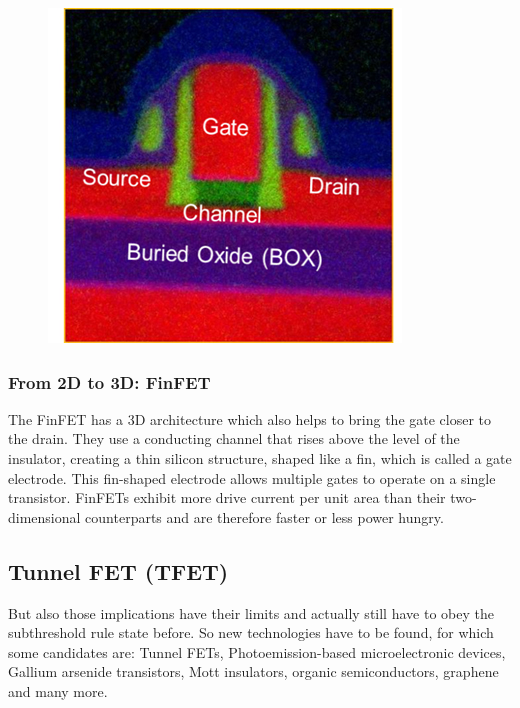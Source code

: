 \documentclass[11pt]{article}
\begin{document}
\begin{figure}[H]
\centering
\includegraphics[width=.3\textwidth]{UTBSOIem}
\label{fig:UTBSOIem}
\end{figure}

\subsubsection{From 2D to 3D: FinFET}
The FinFET has a 3D architecture which also helps to bring the gate closer to the drain. They use a conducting channel that rises above the level of the insulator, creating a thin silicon structure, shaped like a fin, which is called a gate electrode. This fin-shaped electrode allows multiple gates to operate on a single transistor. FinFETs exhibit more drive current per unit area than their two-dimensional counterparts and are therefore faster or less power hungry. 

\subsection{Tunnel FET (TFET)}
But also those implications have their limits and actually still have to obey the subthreshold rule state before. So new technologies have to be found, for which some candidates are: Tunnel FETs, Photoemission-based microelectronic devices, Gallium arsenide transistors, Mott insulators, organic semiconductors, graphene and many more.
\end{document}
